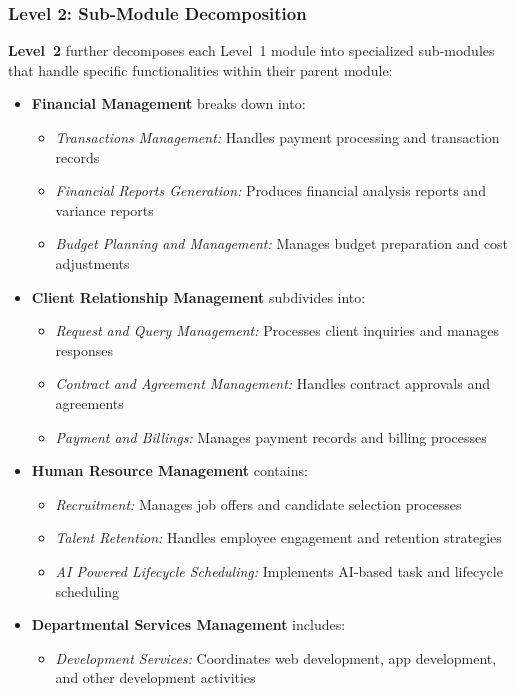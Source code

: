 \documentclass[12pt,a4paper]{article}
\begin{document}
\subsubsection{Level 2: Sub-Module Decomposition}
\textbf{Level~2} further decomposes each Level~1 module into specialized sub‑modules that handle specific functionalities within their parent module:

\begin{itemize}
    \item \textbf{Financial Management} breaks down into:
    \begin{itemize}
        \item \textit{Transactions Management:} Handles payment processing and transaction records
        \item \textit{Financial Reports Generation:} Produces financial analysis reports and variance reports
        \item \textit{Budget Planning and Management:} Manages budget preparation and cost adjustments
    \end{itemize}
    
    \item \textbf{Client Relationship Management} subdivides into:
    \begin{itemize}
        \item \textit{Request and Query Management:} Processes client inquiries and manages responses
        \item \textit{Contract and Agreement Management:} Handles contract approvals and agreements
        \item \textit{Payment and Billings:} Manages payment records and billing processes
    \end{itemize}
    
    \item \textbf{Human Resource Management} contains:
    \begin{itemize}
        \item \textit{Recruitment:} Manages job offers and candidate selection processes
        \item \textit{Talent Retention:} Handles employee engagement and retention strategies
        \item \textit{AI Powered Lifecycle Scheduling:} Implements AI‑based task and lifecycle scheduling
    \end{itemize}
    
    \item \textbf{Departmental Services Management} includes:
    \begin{itemize}
        \item \textit{Development Services:} Coordinates web development, app development, and other development activities
    \end{itemize}
    

\end{itemize}
\end{document}
